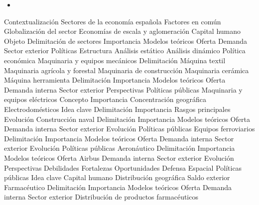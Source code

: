 \documentclass{nuevotema}
\begin{document}
\ideaclave




\begin{itemize}
	\item 
\end{itemize}

\esquemacorto

\begin{esquema}[enumerate]
	\1[] 
		\2 Contextualización
			\3 Sectores de la economía española
			\3 Factores en común
			\3 Globalización del sector
			\3 Economías de escala y aglomeración
			\3 Capital humano
		\2 Objeto
			\3 Delimitación de sectores
			\3 Importancia
			\3 Modelos teóricos
			\3 Oferta
			\3 Demanda
			\3 Sector exterior
			\3 Políticas
		\2 Estructura
			\3 Análisis estático
			\3 Análisis dinámico
			\3 Política económica
	\1 
		\2 Maquinaria y equipos mecánicos
			\3 Delimitación
			\3 Máquina textil
			\3 Maquinaria agrícola y forestal
			\3 Maquinaria de construcción
			\3 Maquinaria cerámica
		\2 Máquina herramienta
			\3 Delimitación
			\3 Importancia
			\3 Modelos teóricos
			\3 Oferta
			\3 Demanda interna
			\3 Sector exterior
			\3 Perspectivas
			\3 Políticas públicas
		\2 Maquinaria y equipos eléctricos
			\3 Concepto
			\3 Importancia
			\3 Concentración geográfica
			\3 Electrodomésticos
	\1 
		\2 Idea clave
			\3 Delimitación
			\3 Importancia
			\3 Rasgos principales
			\3 Evolución
		\2 Construcción naval
			\3 Delimitación
			\3 Importancia
			\3 Modelos teóricos
			\3 Oferta
			\3 Demanda interna
			\3 Sector exterior
			\3 Evolución
			\3 Políticas públicas
		\2 Equipos ferroviarios
			\3 Delimitación
			\3 Importancia
			\3 Modelos teóricos
			\3 Oferta
			\3 Demanda interna
			\3 Sector exterior
			\3 Evolución
			\3 Políticas públicas
		\2 Aeronáutico
			\3 Delimitación
			\3 Importancia
			\3 Modelos teóricos
			\3 Oferta
			\3 Airbus
			\3 Demanda interna
			\3 Sector exterior
			\3 Evolución
			\3 Perspectivas
			\3 Debilidades
			\3 Fortalezas
			\3 Oportunidades
			\3 Defensa
			\3 Espacial
			\3 Políticas públicas
	\1 
		\2 Idea clave
			\3 Capital humano
			\3 Distribución geográfica
			\3 Saldo exterior
		\2 Farmacéutico
			\3 Delimitación
			\3 Importancia
			\3 Modelos teóricos
			\3 Oferta
			\3 Demanda interna
			\3 Sector exterior
			\3 Distribución de productos farmacéuticos

\end{esquema}
\end{document}
